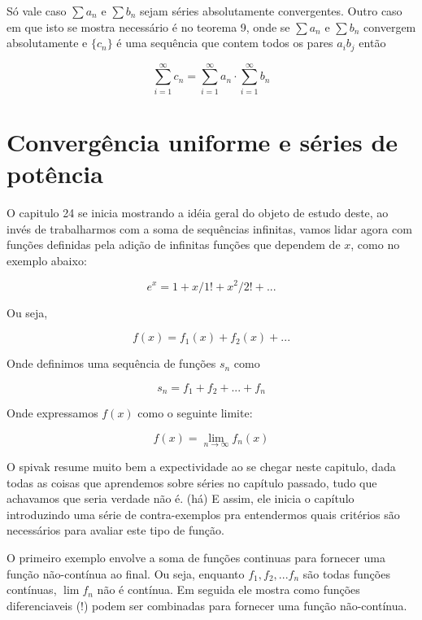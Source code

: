 \documentclass[a4paper, 12pt]{article}
\begin{document}
Só vale caso $\sum a_n$ e $\sum b_n$ sejam séries absolutamente convergentes. Outro caso em que isto
se mostra necessário é no teorema 9, onde se $\sum a_n$ e $\sum b_n$ convergem absolutamente e $\{c_n\}$
é uma sequência que contem todos os pares $a_ib_j$ então

\begin{equation}
 \nonumber \sum_{i=1}^\infty c_n = \sum_{i=1}^\infty a_n \cdot \sum_{i=1}^\infty b_n  
\end{equation}

\newpage
\section{Convergência uniforme e séries de potência}

O capitulo 24 se inicia mostrando a idéia geral do objeto de estudo deste, ao invés de 
trabalharmos com a soma de sequências infinitas, vamos lidar agora com funções definidas
pela adição de infinitas funções que dependem de $x$, como no exemplo abaixo:

\begin{equation}
	\nonumber e^x = 1 + x/1! + x^2/2! + ...
\end{equation}

Ou seja,

\begin{equation}
	\nonumber f(x) = f_1(x) + f_2(x) + ...
\end{equation}

Onde definimos uma sequência de funções $s_n$ como

\begin{equation}
	\nonumber s_n = f_1 + f_2 + ... + f_n
\end{equation}

Onde expressamos $f(x)$ como o seguinte limite:

\begin{equation}
	\nonumber f(x) = \lim_{n \to \infty} f_n(x)
\end{equation}

O spivak resume muito bem a expectividade ao se chegar neste capitulo, dada todas as coisas
que aprendemos sobre séries no capítulo passado, tudo que achavamos que seria verdade não é. (há)
E assim, ele inicia o capítulo introduzindo uma série de contra-exemplos pra entendermos quais critérios
são necessários para avaliar este tipo de função.

O primeiro exemplo envolve a soma de funções continuas para fornecer uma função não-contínua 
ao final. Ou seja, enquanto $f_1, f_2, ... f_n$ são todas funções contínuas, $\lim f_n$ não é
contínua. Em seguida ele mostra como funções diferenciaveis (!) podem ser combinadas para fornecer
uma função não-contínua.
\end{document}
